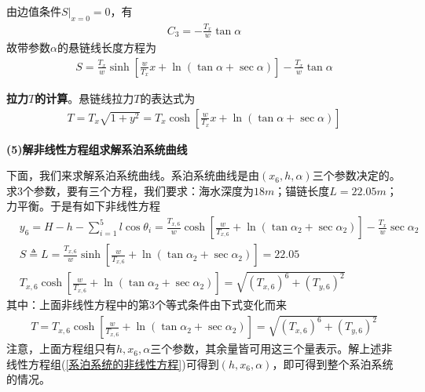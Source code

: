             由边值条件$S|_{x=0}=0$，有
            \begin{align*}
            C_3=-\frac{T_x}{w}\tan\alpha
            \end{align*}
            故带参数$\alpha$的悬链线长度方程为
            \begin{align*}
            S = \frac{T_x}{w}\sinh\left[ \frac{w}{T_x}x+\ln (\tan\alpha+\sec\alpha) \right]-\frac{T_x}{w}\tan\alpha
            \end{align*}
            \par
            \textbf{拉力$T$的计算}。悬链线拉力$T$的表达式为
            \begin{align*}
            T=T_x\sqrt{1+y^2}=T_x\cosh\left[ \frac{w}{T_x}x+\ln (\tan\alpha+\sec\alpha) \right]
            \end{align*}
            \par
            \textbf{(5)解非线性方程组求解系泊系统曲线}
            \par
            下面，我们来求解系泊系统曲线。系泊系统曲线是由$(x_6,h,\alpha)$三个参数决定的。求3个参数，要有三个方程，我们要求：海水深度为$18m$；锚链长度$L=22.05m$；力平衡。于是有如下非线性方程
            \begin{align}
            \label{系泊系统的非线性方程}
            &y_6  = H-h-\sum_{i=1}^5l\cos\theta_i=\frac{T_{x,6}}{w}\cosh\left[ \frac{w}{T_{x,6}}+\ln (\tan\alpha_2+\sec\alpha_2) \right]-\frac{T_x}{w}\sec\alpha_2\\
            &S \triangleq L = \frac{T_{x,6}}{w}\sinh\left[ \frac{w}{T_{x,6}}+\ln (\tan\alpha_2+\sec\alpha_2) \right]=22.05\\
            &T_{x,6}\cosh \left[\frac{w}{T_{x,6}}+\ln (\tan\alpha_2+\sec\alpha_2)\right]  = \sqrt{(T_{x,6})^6+(T_{y,6})^2}
            \end{align}
            其中：上面非线性方程中的第3个等式条件由下式变化而来
            \begin{align*}
            T = T_{x,6}\cosh\left[\frac{w}{T_{x,6}}+\ln (\tan\alpha_2+\sec\alpha_2)\right] = \sqrt{(T_{x,6})^6+(T_{y,6})^2}
            \end{align*}
            注意，上面方程组只有$h,x_6,\alpha$三个参数，其余量皆可用这三个量表示。解上述非线性方程组(\ref{系泊系统的非线性方程})可得到$(h,x_6,\alpha)$，即可得到整个系泊系统的情况。

